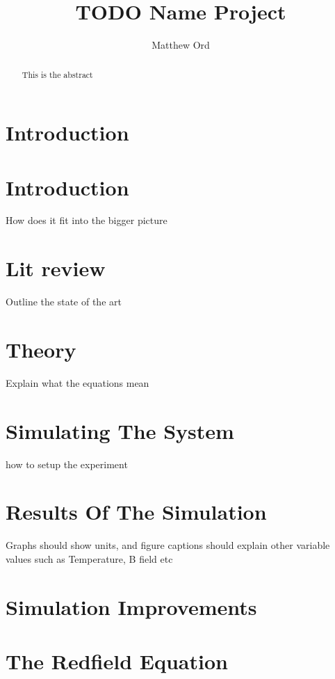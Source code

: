 \documentclass{article}
\title{TODO Name Project}
\author{Matthew Ord}
\date{}
\begin{document}
\maketitle

\begin{abstract}
    This is the abstract
\end{abstract}



\pagebreak
\section{Introduction}


\section{Introduction}
How does it fit into the bigger picture

\section{Lit review}
Outline the state of the art

\section{Theory}
Explain what the equations mean


\section{Simulating The System}
how to setup the experiment


\section{Results Of The Simulation}
Graphs should show units, and figure captions should explain other variable values such as Temperature, B
field etc

\section{Simulation Improvements}



\section{The Redfield Equation}

\end{document}
